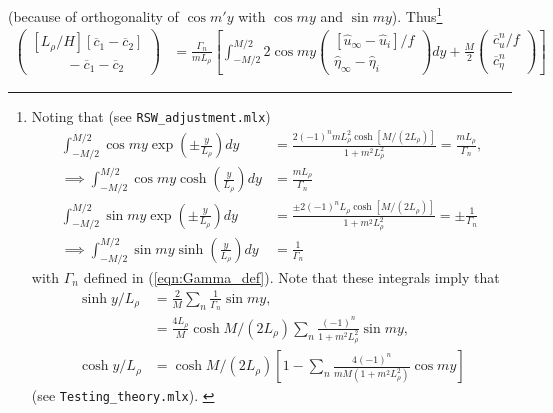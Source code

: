 \documentclass[10pt,reqno]{amsart}
\begin{document}
(because of orthogonality of $\cos m' y$ with $\cos m y $ and $\sin m y$).
Thus\footnote{Noting that (see \texttt{RSW\_adjustment.mlx})
\begin{align}
\int_{-M/2}^{M/2} \cos m y \exp \left(\pm \frac{y}{L_\rho} \right) dy &= \frac{ 2 (-1)^{n} m L_\rho^2 \cosh \left[ M/(2 L_\rho) \right]}{1 + m^2 L_\rho^2}  = \frac{m L_\rho}{\Gamma_n} , \label{eqn:cosine_integral}\\
\implies 
\int_{-M/2}^{M/2} \cos m y \cosh \left( \frac{y}{L_\rho} \right) dy &= \frac{m L_\rho}{\Gamma_n} \\
\int_{-M/2}^{M/2} \sin m y \exp \left(\pm \frac{y}{L_\rho} \right) dy &= \frac{ \pm 2 (-1)^n L_\rho \cosh \left[ M/(2 L_\rho) \right]}{1 + m^2 L_\rho^2} = \pm \frac{1}{\Gamma_n} \label{eqn:sine_exp_integral} \\
\implies 
\int_{-M/2}^{M/2} \sin m y \sinh \left( \frac{y}{L_\rho} \right) dy &= \frac{1}{\Gamma_n}
\end{align}
with $\Gamma_n$ defined in (\ref{eqn:Gamma_def}).
Note that these integrals imply that
\begin{align}
\sinh y / L_\rho & = \frac{2}{M} \sum_n \frac {1}{\Gamma_n} \sin m y  , \\
 & = \frac{4 L_\rho}{M}  \cosh M/(2 L_\rho)  \sum_n \frac {(-1)^{n} }{ 1 + m^2 L_\rho^2 } \sin m y  , \label{eqn:sinh_expansion} \\
\cosh y / L_\rho & = \cosh M/(2 L_\rho)  \left[ 1 - \sum_n \frac{4 (-1)^n }{m M \left( 1 + m^2 L_\rho^2 \right)} \cos m y  \right]
\label{eqn:cosh_expansion}
\end{align}
(see \texttt{Testing\_theory.mlx}).
\label{fn:cosh_sinh_exp_integrals}
}
\begin{align}
\begin{pmatrix} 
[L_\rho/H] \left[ \overline{c}_1 - \overline{c}_2 \right]\\
\;\;\;\;\; \;\; \;\; - \overline{c}_1 - \overline{c}_2 
\end{pmatrix}  
& =
\frac{\Gamma_n}{m L_\rho}
\left[
\int_{-M/2}^{M/2}  2 \cos m y
\begin{pmatrix} 
\left[ \hat{u}_\infty - \hat{u}_i \right] / f\\
\hat{\eta}_\infty - \hat{\eta}_i
\end{pmatrix}   dy 
+
\frac{M}{2}
\begin{pmatrix}
\overline{c}_u^{n} /f \\
\overline{c}_\eta^{n}  
\end{pmatrix}
\right]
\label{eqn:Kwave_coeffs1}
\end{align}
\end{document}
